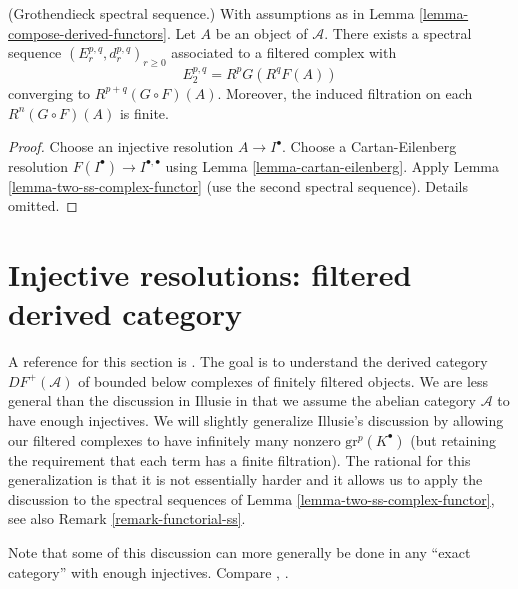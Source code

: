 \begin{lemma}
\label{lemma-grothendieck-spectral-sequence}
(Grothendieck spectral sequence.)
With assumptions as in Lemma \ref{lemma-compose-derived-functors}.
Let $A$ be an object of $\mathcal{A}$.
There exists a spectral sequence $(E_r^{p, q}, d_r^{p, q})_{r \geq 0}$
associated to a filtered complex with
$$
E_2^{p, q} = R^pG(R^qF(A))
$$
converging to $R^{p + q}(G \circ F)(A)$. Moreover, the induced filtration
on each $R^n(G \circ F)(A)$ is finite.
\end{lemma}

\begin{proof}
Choose an injective resolution $A \to I^\bullet$.
Choose a Cartan-Eilenberg resolution
$F(I^\bullet) \to I^{\bullet, \bullet}$
using
Lemma \ref{lemma-cartan-eilenberg}.
Apply
Lemma \ref{lemma-two-ss-complex-functor}
(use the second spectral sequence).
Details omitted.
\end{proof}




\section{Injective resolutions: filtered derived category}
\label{section-filtered-derived}

\noindent
A reference for this section is \cite[I, Chapter V]{cotangent}.
The goal is to understand the derived category $DF^{+}(\mathcal{A})$
of bounded below complexes of finitely filtered objects.
We are less general than the discussion in Illusie in that we
assume the abelian category $\mathcal{A}$ to have enough injectives.
We will slightly generalize Illusie's discussion by allowing our
filtered complexes to have infinitely many nonzero $\text{gr}^p(K^\bullet)$
(but retaining the requirement that each term has a finite filtration).
The rational for this generalization is that it is not essentially
harder and it allows us to apply the discussion to the spectral sequences of
Lemma \ref{lemma-two-ss-complex-functor}, see also
Remark \ref{remark-functorial-ss}.

\medskip\noindent
Note that some of this discussion can more generally be done in any
``exact category'' with enough injectives. Compare \cite{Buhler}, \cite{Keller}.


